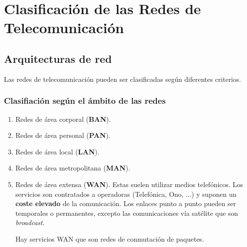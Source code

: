 \documentclass[a4paper]{book}
\numberwithin{figure}{chapter}
\numberwithin{equation}{subsection}
\begin{document}
\section{Clasificación de las Redes de Telecomunicación}
\subsection{Arquitecturas de red}
Las redes de telecomunicación pueden ser clasificadas según diferentes criterios.
\subsubsection{Clasifiación según el ámbito de las redes}
\vspace{\parskip}
\begin{enumerate}
  \item Redes de área corporal (\textbf{BAN}).
  \item Redes de área personal (\textbf{PAN}).
  \item Redes de área local (\textbf{LAN}).
  \item Redes de área metropolitana (\textbf{MAN}).
  \item Redes de área extensa (\textbf{WAN}). Estas suelen utilizar medios telefónicos. Los servicios son contratados a operadoras (Telefónica, Ono, ...) y suponen un \textbf{coste elevado} de la comunicación. Los enlaces punto a punto pueden ser temporales o permanentes, excepto las comunicaciones vía satélite que son \textsl{broadcast}.

        Hay servicios WAN que son redes de conmutación de paquetes.
\end{enumerate}
\end{document}
